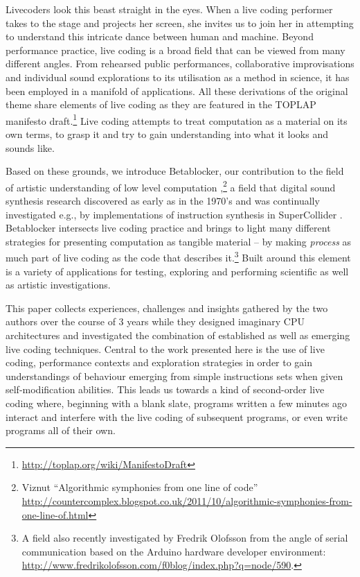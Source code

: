 \documentclass[letterpaper, 12pt]{article}
\begin{document}
Livecoders look this beast straight in the eyes.
When a live coding performer takes to the stage and projects her screen, she invites us to join her in attempting to understand this intricate dance between human and machine.
Beyond performance practice, live coding is a broad field that can be viewed from many different angles.
From rehearsed public performances, collaborative improvisations and individual sound explorations to its utilisation as a method in science, it has been employed in a manifold of applications.
All these derivations of the original theme share elements of live coding as they are featured in the TOPLAP manifesto draft.\footnote{\url{http://toplap.org/wiki/ManifestoDraft}} \citep{ward2004-liv}
Live coding attempts to treat computation as a material on its own terms, to grasp it and try to gain understanding into what it looks \citep{mclean2010-vis} and sounds like.

Based on these grounds, we introduce Betablocker, our contribution to the field of artistic understanding of low level computation \citep{2006-the},\footnote{Viznut ``Algorithmic symphonies from one line of code'' \url{http://countercomplex.blogspot.co.uk/2011/10/algorithmic-symphonies-from-one-line-of.html}} a field that digital sound synthesis research discovered as early as in the 1970's \citep{berg2009-com} and was continually investigated e.g., by implementations of instruction synthesis in SuperCollider \citep{collins2008-err}.
Betablocker intersects live coding practice and brings to light many different strategies for presenting computation as tangible material -- by making \emph{process} as much part of live coding as the code that describes it.\footnote{A field also recently investigated by Fredrik Olofsson from the angle of serial communication based on the Arduino hardware developer environment: \url{http://www.fredrikolofsson.com/f0blog/index.php?q=node/590}.}
Built around this element is a variety of applications for testing, exploring and performing scientific as well as artistic investigations.


This paper collects experiences, challenges and insights gathered by the two authors over the course of 3 years while they designed imaginary CPU architectures and investigated the combination of established as well as emerging live coding techniques.
Central to the work presented here is the use of live coding, performance contexts and exploration strategies in order to gain understandings of behaviour emerging from simple instructions sets when given self-modification abilities.
This leads us towards a kind of second-order live coding where, beginning with a blank slate, programs written a few minutes ago interact and interfere with the live coding of subsequent programs, or even write programs all of their own.
\parskip 18pt
\end{document}
